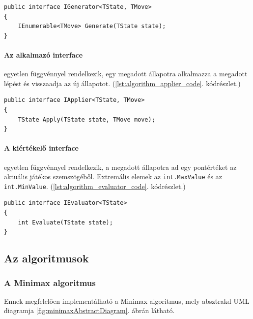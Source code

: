 \documentclass[twoside, a4paper, 12pt]{article}
\begin{document}
\begin{lstlisting}[caption=A generátor interface, label=lst:algorithm_generator_code]
public interface IGenerator<TState, TMove>
{
	IEnumerable<TMove> Generate(TState state);
}
\end{lstlisting}


\paragraph{Az alkalmazó interface} egyetlen függvénnyel rendelkezik, egy megadott állapotra alkalmazza a megadott lépést és visszaadja az új állapotot. (\ref{lst:algorithm_applier_code}. kódrészlet.)

\begin{lstlisting}[caption=Az alkalmazó interface, label=lst:algorithm_applier_code]
public interface IApplier<TState, TMove>
{
	TState Apply(TState state, TMove move);
}
\end{lstlisting}

\paragraph{A kiértékelő interface} egyetlen függvénnyel rendelkezik, a megadott állapotra ad egy pontértéket az aktuális játékos szemszögéből. Extremális elemek az \texttt{int.MaxValue} és az \texttt{int.MinValue}. (\ref{lst:algorithm_evaluator_code}. kódrészlet.)

\begin{lstlisting}[caption=A kiértékelő interface, label=lst:algorithm_evaluator_code]
public interface IEvaluator<TState>
{
	int Evaluate(TState state);
}
\end{lstlisting}



\subsection{Az algoritmusok}

\subsubsection{A Minimax algoritmus}
Ennek megfelelően implementálható a Minimax algoritmus, mely absztrakd UML diagramja \ref{fig:minimaxAbstractDiagram}. ábrán látható.
\end{document}

